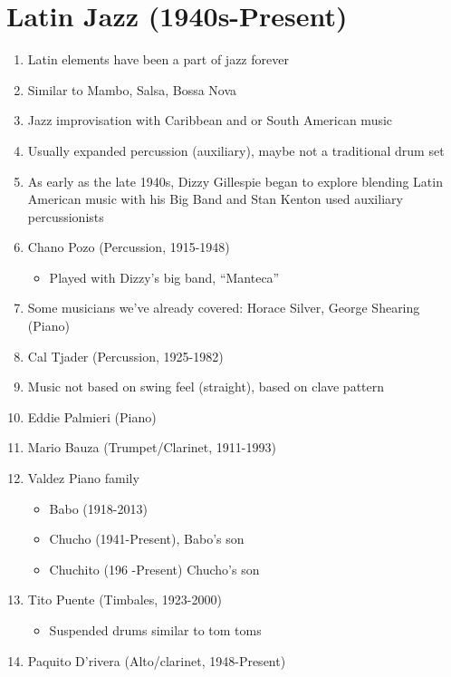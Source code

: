 \documentclass[]{article}
\providecommand{\tightlist}{%
  \setlength{\itemsep}{0pt}\setlength{\parskip}{0pt}}
\begin{document}
\section{Latin Jazz (1940s-Present)}\label{latin-jazz-1940s-present}

\begin{enumerate}
\def\labelenumi{\arabic{enumi}.}
\tightlist
\item
  Latin elements have been a part of jazz forever
\item
  Similar to Mambo, Salsa, Bossa Nova
\item
  Jazz improvisation with Caribbean and or South American music
\item
  Usually expanded percussion (auxiliary), maybe not a traditional drum
  set
\item
  As early as the late 1940s, Dizzy Gillespie began to explore blending
  Latin American music with his Big Band and Stan Kenton used auxiliary
  percussionists
\item
  Chano Pozo (Percussion, 1915-1948)

  \begin{itemize}
  \tightlist
  \item
    Played with Dizzy's big band, ``Manteca''
  \end{itemize}
\item
  Some musicians we've already covered: Horace Silver, George Shearing
  (Piano)
\item
  Cal Tjader (Percussion, 1925-1982)
\item
  Music not based on swing feel (straight), based on clave pattern
\item
  Eddie Palmieri (Piano)
\item
  Mario Bauza (Trumpet/Clarinet, 1911-1993)
\item
  Valdez Piano family

  \begin{itemize}
  \tightlist
  \item
    Babo (1918-2013)
  \item
    Chucho (1941-Present), Babo's son
  \item
    Chuchito (196 -Present) Chucho's son
  \end{itemize}
\item
  Tito Puente (Timbales, 1923-2000)

  \begin{itemize}
  \tightlist
  \item
    Suspended drums similar to tom toms
  \end{itemize}
\item
  Paquito D'rivera (Alto/clarinet, 1948-Present)


\end{enumerate}
\end{document}
